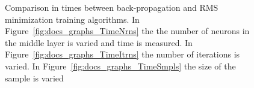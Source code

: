 \documentclass[11pt]{article}
\begin{document}
\begin{figure}[]
	\centering
		   
		
		\caption{Comparison in times between back-propagation and RMS minimization training algorithms. In Figure~\ref{fig:docs_graphs_TimeNrns} the the number of neurons in the middle layer is varied and time is measured. In Figure~\ref{fig:docs_graphs_TimeItrns} the number of iterations is varied. In Figure~\ref{fig:docs_graphs_TimeSmpls} the size of the sample is varied }
	\label{fig:docs_graphs_Time}	
\end{figure}
\end{document}
